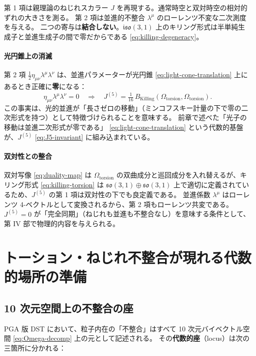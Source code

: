 \documentclass[dvipdfmx,a4paper,oneside]{jsbook}
\numberwithin{equation}{chapter}
\begin{document}
第 1 項は親理論のねじれスカラー \(J\) を再現する。通常時空と双対時空の相対的ずれの大きさを測る。
第 2 項は並進的不整合 \(\lambda^\mu\) のローレンツ不変な二次測度を与える。
二つの寄与は\textbf{結合しない}。\(\mathfrak{iso}(3,1)\) 上のキリング形式は半単純生成子と並進生成子の間で零だからである \eqref{eq:killing-degeneracy}。

\paragraph{光円錐上の消滅}
第 2 項 \(\tfrac{1}{2}\eta_{\mu\nu}\lambda^\mu\lambda^\nu\) は、並進パラメーターが光円錐 \eqref{eq:light-cone-translation} 上にあるとき正確に\textbf{零}になる：
\begin{equation}
  \eta_{\mu\nu}\lambda^\mu\lambda^\nu = 0
  \quad\Longrightarrow\quad
  J^{(5)} = \tfrac{1}{16}\, B_{\mathrm{Killing}}(\Omega_{\mathrm{torsion}}, \Omega_{\mathrm{torsion}}).
  \label{eq:J5-light-cone}
\end{equation}
この事実は、光的並進が「長さゼロの移動」（ミンコフスキー計量の下で零の二次形式を持つ）として特徴づけられることを意味する。
前章で述べた「光子の移動は並進二次形式が零である」 \eqref{eq:light-cone-translation} という代数的基盤が、\(J^{(5)}\) \eqref{eq:J5-invariant} に組み込まれている。

\paragraph{双対性との整合}
双対写像 \eqref{eq:duality-map} は \(\Omega_{\mathrm{torsion}}\) の双曲成分と巡回成分を入れ替えるが、キリング形式 \eqref{eq:killing-torsion} は \(\mathfrak{so}(3,1) \oplus \mathfrak{so}(3,1)\) 上で適切に定義されているため、\(J^{(5)}\) の第 1 項は双対性の下でも良定義である。
並進係数 \(\lambda^\mu\) はローレンツ 4-ベクトルとして変換されるから、第 2 項もローレンツ共変である。
\(J^{(5)} = 0\) が「完全同期」（ねじれも並進も不整合なし）を意味する条件として、第 IV 部で物理的内容を与えられる。

\section{トーション・ねじれ不整合が現れる代数的場所の準備}

\subsection{10 次元空間上の不整合の座}

PGA 版 DST において、粒子内在の「不整合」はすべて 10 次元バイベクトル空間 \eqref{eq:Omega-decomp} 上の元として記述される。
その\textbf{代数的座}（locus）は次の三箇所に分かれる：
\end{document}
